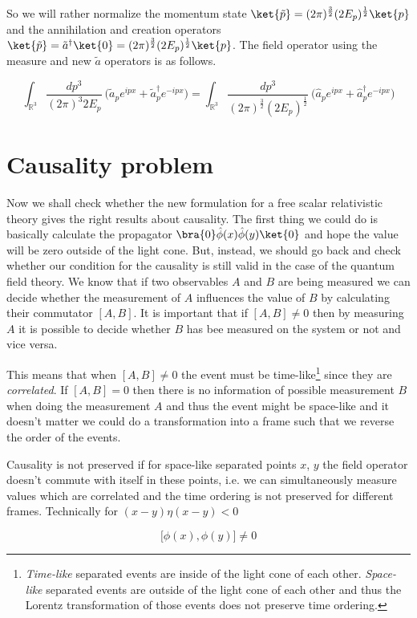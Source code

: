 So we will rather normalize the momentum state $\ket{\tilde{p}} = (2 \pi)^{\frac{3}{2}} (2 E_{p})^{\frac{1}{2}} \ket{p}$ and
the annihilation and creation operators $\ket{\tilde{p}} = \tilde{a}^{\dagger} \ket{0} = (2 \pi)^{\frac{3}{2}} (2 E_{p})^{\frac{1}{2}} \ket{p}$.
The field operator using the measure and new $\tilde{a}$ operators is as follows.

\begin{equation*}
    \int_{\mathbb{R}^{3}} \frac{dp^{3}}{(2 \pi)^{3} 2 E_{p}} \ \big(\tilde{a}_{p} e^{i p x} + \tilde{a}^{\dagger}_{p} e^{- i p x}\big) = 
    \int_{\mathbb{R}^{3}} \frac{dp^{3}}{(2 \pi)^{\frac{3}{2}} (2 E_{p})^{\frac{1}{2}}} \ \big(\hat{a}_{p} e^{i p x} + \hat{a}^{\dagger}_{p} e^{- i p x}\big)
\end{equation*}

\section{Causality problem}

Now we shall check whether the new formulation for a free scalar relativistic theory gives the right results about causality.
The first thing we could do is basically calculate the propagator $\bra{0} \hat{\phi}(x) \hat{\phi}(y) \ket{0}$ and hope the 
value will be zero outside of the light cone. But, instead, we should go back and check whether our condition for the causality
is still valid in the case of the quantum field theory. We know that if two observables $A$ and $B$ are being measured we can
decide whether the measurement of $A$ influences the value of $B$ by calculating their commutator $[A, B]$. It is important that
if $[A, B] \neq 0$ then by measuring $A$ it is possible to decide whether $B$ has bee measured on the system or not and vice 
versa.

This means that when $[A, B] \neq 0$ the event must be time-like\footnote{
\textit{Time-like} separated events are inside of the light cone of each other.
\textit{Space-like} separated events are outside of the light cone of each other and thus the Lorentz transformation of those 
events does not preserve time ordering.} since they are \textit{correlated}. If $[A, B] = 0$ then there is no information of possible
measurement $B$ when doing the measurement $A$ and thus the event might be space-like and it doesn't matter we could do a transformation
into a frame such that we reverse the order of the events.

\begin{definition}
    \label{df:causality_field_theory}
    Causality is not preserved if for space-like separated points $x$, $y$ the field operator doesn't commute with itself in these points, i.e.
    we can simultaneously measure values which are correlated and the time ordering is not preserved for different frames. Technically for
    $(x - y) \eta (x - y) < 0$

    \begin{equation}
        \big[\phi(x), \phi(y)\big] \neq 0
    \end{equation}

\end{definition}

